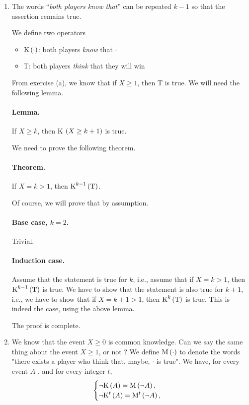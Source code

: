 \begin{enumerate}[label=\alph*.]
  
  \item The words ``\textit{both players know that}'' can be repeated $k-1$ so that the assertion remains true.
  
  We define two operators
  \begin{itemize}
    \item $\text{K} \left(\cdot\right)$: both players \textit{know} that $\cdot$ 
    \item T: both players \textit{think} that they will win 
  \end{itemize}
  
  From exercise (a), we know that if $X \geq 1$, then T is true. We will need the following lemma.
  
  \paragraph{Lemma.} If $X \geq k$, then K $\left(X \geq k+1\right)$ is true.
  
  We need to prove the following theorem.
  
  \paragraph{Theorem.} If $X = k > 1$, then $\text{K}^{k-1} \left(\text{T}\right)$.
  
  Of course, we will prove that by assumption.
  
  \paragraph{Base case, $k=2$.} Trivial.
  \paragraph{Induction case.} Assume that the statement is true for $k$, i.e., assume that if $X = k > 1$, then $\text{K}^{k-1} \left(\text{T}\right)$ is true. We have to show that the statement is also true for $k+1$, i.e., we have to show that if $X = k+1 > 1$, then $\text{K}^{k} \left(\text{T}\right)$ is true. This is indeed the case, using the above lemma.
  
  The proof is complete.
  
  
  \item We know that the event $X \geq 0$ is common knowledge. Can we say the same thing about the event $X \geq 1$, or not ?
  We define $\text{M} \left(\cdot\right)$ to denote the words "there exists a player who think that, maybe, $\cdot$ is true". We have, for every event $A$ , and for every integer $t$, 
  \begin{equation*}
      \begin{cases}
        \neg \text{K} \left(A\right) = \text{M} \left(\neg A\right), \\
        \neg \text{K}^{t} \left(A\right) = \text{M}^{t} \left(\neg A\right),
      \end{cases}
  \end{equation*}
  

\end{enumerate}
